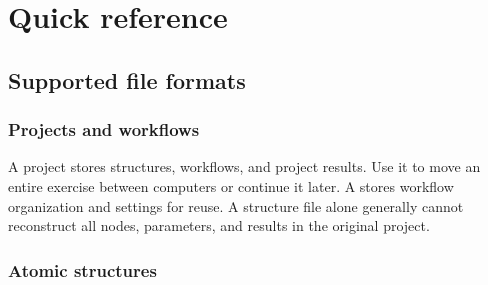 \chapter{Quick reference}\label{ch:reference}


\section{Supported file formats}

\subsection{Projects and workflows}

A  project stores structures, workflows, and project results. Use it to move an entire exercise between computers or continue it later. A  stores workflow organization and settings for reuse. A structure file alone generally cannot reconstruct all nodes, parameters, and results in the original project.

\Needspace{38mm}
\subsection{Atomic structures}


